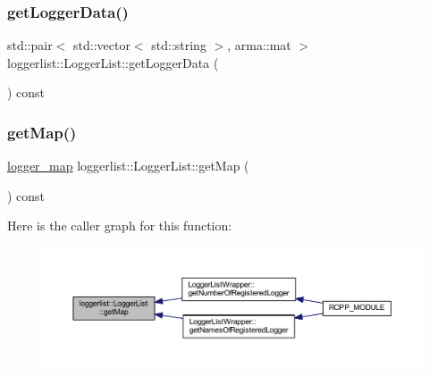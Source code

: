 \subsubsection{\texorpdfstring{get\+Logger\+Data()}{getLoggerData()}}
{\footnotesize\ttfamily std\+::pair$<$ std\+::vector$<$ std\+::string $>$, arma\+::mat $>$ loggerlist\+::\+Logger\+List\+::get\+Logger\+Data (\begin{DoxyParamCaption}{ }\end{DoxyParamCaption}) const}

\mbox{\label{classloggerlist_1_1_logger_list_a285a608bfb974314cf91e7a0137aa90f}} 
\subsubsection{\texorpdfstring{get\+Map()}{getMap()}}
{\footnotesize\ttfamily \mbox{\hyperlink{loggerlist_8h_afa233b5ec9ffbe76605d913e86d40fe6}{logger\+\_\+map}} loggerlist\+::\+Logger\+List\+::get\+Map (\begin{DoxyParamCaption}{ }\end{DoxyParamCaption}) const}

Here is the caller graph for this function\+:\nopagebreak
\begin{figure}[H]
\begin{center}
\leavevmode
\includegraphics[width=350pt]{classloggerlist_1_1_logger_list_a285a608bfb974314cf91e7a0137aa90f_icgraph}
\end{center}
\end{figure}
\mbox{\label{classloggerlist_1_1_logger_list_ad11e128af600ad8e68df3c702ef11792}} 
